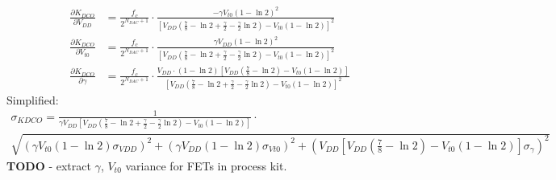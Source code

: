 		\begin{align}
			\frac{\partial K_{DCO}}{\partial V_{DD}} &= \frac{f_c}{2^{N_{DAC}+1}}\cdot\frac{-\gamma V_{t0}(1-\ln2)^2}{\left[ V_{DD}\left(\frac{7}{8}-\ln2+\frac{\gamma}{2}-\frac{\gamma}{2}\ln2\right)-V_{t0}\left(1-\ln2\right) \right]^2}\\
			\frac{\partial K_{DCO}}{\partial V_{t0}} &= \frac{f_c}{2^{N_{DAC}+1}}\cdot\frac{\gamma V_{DD}(1-\ln2)^2}{\left[ V_{DD}\left(\frac{7}{8}-\ln2+\frac{\gamma}{2}-\frac{\gamma}{2}\ln2\right)-V_{t0}\left(1-\ln2\right) \right]^2}\\
			\frac{\partial K_{DCO}}{\partial \gamma} &= \frac{f_c}{2^{N_{DAC}+1}}\cdot\frac{V_{DD}\cdot(1-\ln2) \left[ V_{DD}\left(\frac{7}{8}-\ln2\right)-V_{t0}\left(1-\ln2\right) \right]}{\left[ V_{DD}\left(\frac{7}{8}-\ln2+\frac{\gamma}{2}-\frac{\gamma}{2}\ln2\right)-V_{t0}\left(1-\ln2\right) \right]^2}
		\end{align}
		Simplified:
		\begin{multline}
			\sigma_{KDCO} = \frac{1}{\gamma V_{DD} \left[ V_{DD}\left(\frac{7}{8}-\ln2+\frac{\gamma}{2}-\frac{\gamma}{2}\ln2\right)-V_{t0}\left(1-\ln2\right) \right]}\cdot\\ \sqrt{\left(\gamma V_{t0} (1-\ln2)\sigma_{VDD} \right)^2 + \left(\gamma V_{DD} (1-\ln2)\sigma_{Vt0} \right)^2 + \left( V_{DD}\left[ V_{DD}\left(\frac{7}{8}-\ln2\right)-V_{t0}\left(1-\ln2\right) \right]\sigma_{\gamma} \right)^2 }
		\end{multline}		
		\textbf{TODO} - extract $\gamma$, $V_{t0}$ variance for FETs in process kit.
